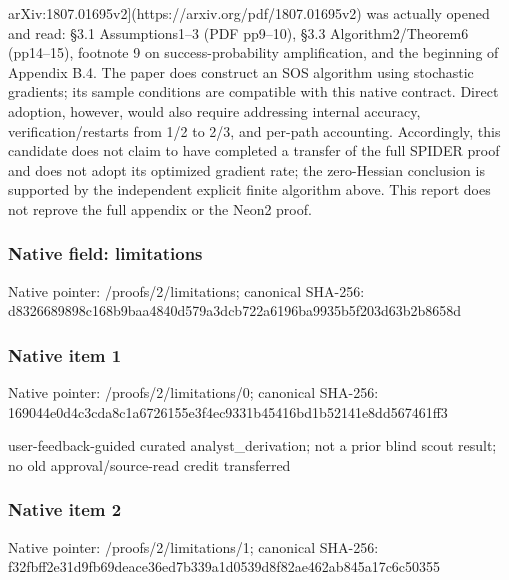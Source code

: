 \documentclass[10pt,a4paper]{article}
\begin{document}
arXiv:\allowbreak{}1807.01695v2](https:\allowbreak{}/\allowbreak{}/\allowbreak{}arxiv.org/\allowbreak{}pdf/\allowbreak{}1807.01695v2) was actually opened and read:\allowbreak{} {\AtlasUnicodeText §}\allowbreak{}3.1 Assumptions1{\AtlasUnicodeText –}\allowbreak{}3 (PDF pp9{\AtlasUnicodeText –}\allowbreak{}10),\allowbreak{} {\AtlasUnicodeText §}\allowbreak{}3.3 Algorithm2/\allowbreak{}Theorem6 (pp14{\AtlasUnicodeText –}\allowbreak{}15),\allowbreak{} footnote 9 on success-probability amplification,\allowbreak{} and the beginning of Appendix B.4. The paper does construct an SOS algorithm using stochastic gradients;\allowbreak{} its sample conditions are compatible with this native contract. Direct adoption,\allowbreak{} however,\allowbreak{} would also require addressing internal accuracy,\allowbreak{} verification/\allowbreak{}restarts from 1/\allowbreak{}2 to 2/\allowbreak{}3,\allowbreak{} and per-path accounting. Accordingly,\allowbreak{} this candidate does not claim to have completed a transfer of the full SPIDER proof and does not adopt its optimized gradient rate;\allowbreak{} the zero-Hessian conclusion is supported by the independent explicit finite algorithm above. This report does not reprove the full appendix or the Neon2 proof.\newline{}\par\endgroup

\subsubsection{Native field: limitations}
Native pointer: /proofs/2/limitations; canonical SHA-256: d8326689898c168b9baa4840d579a3dcb722a6196ba9935b5f203d63b2b8658d

\subsubsection{Native item 1}
Native pointer: /proofs/2/limitations/0; canonical SHA-256: 169044e0d4c3cda8c1a6726155e3f4ec9331b45416bd1b52141e8dd567461ff3

\begingroup\raggedright\sloppy user-feedback-guided curated analyst\_\allowbreak{}derivation;\allowbreak{} not a prior blind scout result;\allowbreak{} no old approval/\allowbreak{}source-read credit transferred\par\endgroup

\subsubsection{Native item 2}
Native pointer: /proofs/2/limitations/1; canonical SHA-256: f32fbff2e31d9fb69deace36ed7b339a1d0539d8f82ae462ab845a17c6c50355
\end{document}
